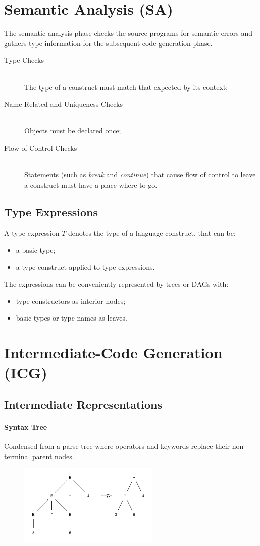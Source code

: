 \chapter{Semantic Analysis (SA)}
The semantic analysis phase checks the source programs for semantic errors and gathers type information for the subsequent code-generation phase.
\begin{description}
	\item[Type Checks]\mbox{} \\
	The type of a construct must match that expected by its context;
	\item[Name-Related and Uniqueness Checks]\mbox{} \\
	Objects must be declared once;
	\item[Flow-of-Control Checks]\mbox{} \\
	Statements (such as \emph{break} and \emph{continue}) that cause flow of control to leave a construct must have a place where to go.
\end{description}

\section{Type Expressions}
A type expression $T$ denotes the type of a language construct, that can be:
\begin{itemize}
	\item a basic type;
	\item a type construct applied to type expressions.
\end{itemize}
The expressions can be conveniently represented by trees or DAGs with:
\begin{itemize}
	\item type constructors as interior nodes;
	\item basic types or type names as leaves.
\end{itemize}

\chapter{Intermediate-Code Generation (ICG)}
\section{Intermediate Representations}
\subsubsection{Syntax Tree}
Condensed from a parse tree where operators and keywords replace their non-terminal parent nodes.
\begin{figure}[H]
	\centerline{\includegraphics[width=0.6\textwidth]{img/15.pdf}}
\end{figure}

